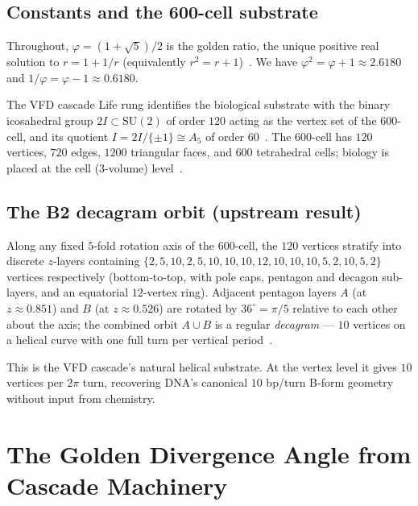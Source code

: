 \documentclass[12pt]{article}
\newcommand{\phig}{\varphi}
\begin{document}
\subsection{Constants and the 600-cell substrate}

Throughout, $\phig = (1+\sqrt{5})/2$ is the golden ratio, the unique
positive real solution to $r = 1 + 1/r$ (equivalently
$r^2 = r + 1$)~\cite[\S F1]{CascadeFoundations}. We have
$\phig^2 = \phig + 1 \approx 2.6180$ and $1/\phig = \phig - 1
\approx 0.6180$.

The VFD cascade Life rung identifies the biological substrate with
the binary icosahedral group $2I \subset \mathrm{SU}(2)$ of order
$120$ acting as the vertex set of the $600$-cell, and its quotient
$I = 2I/\{\pm 1\} \cong A_5$ of order $60$~\cite[\S 2.1--2.3]{CascadeBio}.
The $600$-cell has $120$ vertices, $720$ edges, $1200$ triangular
faces, and $600$ tetrahedral cells; biology is placed at the cell
(3-volume) level~\cite[\S 3.1]{CascadeBio}.

\subsection{The B2 decagram orbit (upstream result)}

Along any fixed $5$-fold rotation axis of the $600$-cell, the
$120$ vertices stratify into discrete $z$-layers containing $\{2,
5, 10, 2, 5, 10, 10, 10, 12, 10, 10, 10, 5, 2, 10, 5, 2\}$ vertices
respectively (bottom-to-top, with pole caps, pentagon and decagon
sub-layers, and an equatorial $12$-vertex ring). Adjacent pentagon
layers $A$ (at $z \approx 0.851$) and $B$ (at $z \approx 0.526$)
are rotated by $36^{\circ} = \pi/5$ relative to each other about
the axis; the combined orbit $A \cup B$ is a regular \emph{decagram}
--- $10$ vertices on a helical curve with one full turn per vertical
period~\cite[\S 5.1]{CascadeBio}.

This is the VFD cascade's natural helical substrate. At the vertex
level it gives $10$ vertices per $2\pi$ turn, recovering DNA's
canonical $10$ bp/turn B-form geometry~\cite[\S 5.2]{CascadeBio}
without input from chemistry.

\section{The Golden Divergence Angle from Cascade Machinery}\label{sec:theta}
\end{document}
